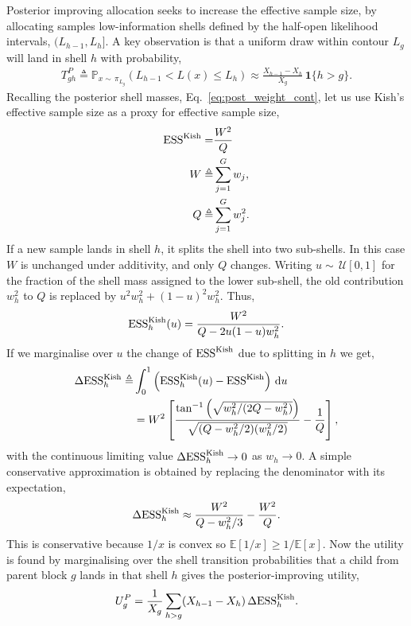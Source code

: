 \documentclass[pdflatex,sn-basic,icol]{sn-jnl}
\newcommand{\dd}{\mathrm{d}}
\newcommand{\E}{\mathbb{E}}
\newcommand{\Prob}{\mathbb{P}}
\theoremstyle{plain}
\theoremstyle{definition}
\begin{document}
\begin{appendices}
Posterior improving allocation seeks to increase the effective sample size, by allocating samples low-information shells defined by the half-open likelihood intervals, $(L_{h-1}, L_h]$.
A key observation is that a uniform draw within contour $L_g$ will land in shell $h$ with probability,
\begin{align}
    T^P_{g h}
    \triangleq
    \Prob_{x\sim\,\pi_{L_{g}}}(L_{h-1} < L(x) \le L_h)
    \approx \frac{ X_{h-1} -  X_{h}}{ X_g} \,\mathbf{1}\{h>g\}.
\end{align}
Recalling the posterior shell masses, Eq.~\ref{eq:post_weight_cont}, let us use Kish's effective sample size as a proxy for effective sample size,
\begin{align}
    \mathrm{ESS}^{\rm Kish} =& \frac{W^2}{Q}\\
    W\triangleq& \sum_{j=1}^{G} w_j,\\
    Q\triangleq& \sum_{j=1}^{G} w_j^2.
\end{align}
If a new sample lands in shell $h$, it splits the shell into two sub-shells.
In this case $W$ is unchanged under additivity, and only $Q$ changes.
Writing $u\sim\,\mathcal{U}[0, 1]$ for the fraction of the shell mass assigned to the lower sub-shell, the old contribution $w_h^2$ to $Q$ is replaced by $u^2 w_h^2+(1-u)^2 w_h^2$.
Thus,
\begin{align}
    \mathrm{ESS}^{\rm Kish}_{h}(u)
    =\frac{W^2}{Q - 2u(1-u)w_h^2}.
\end{align}
If we marginalise over $u$ the change of $\mathrm{ESS}^{\rm Kish}$ due to splitting in $h$ we get,
\begin{align}
    \Delta\mathrm{ESS}^{\rm Kish}_h
    \triangleq&
    \int_0^1
    \left(\mathrm{ESS}^{\rm Kish}_h(u)-\mathrm{ESS}^{\rm Kish}\right)\,\dd u \\
    &=
    W^2\left[
    \frac{
    \tan^{-1}\left(\sqrt{w_h^2/(2Q-w_h^2)}\right)
    }
    {\sqrt{(Q-w_h^2/2)(w_h^2/2)}}
    -\frac{1}{Q}
    \right],
    \label{eq:posterior_shell_value}
\end{align}
with the continuous limiting value $\Delta\mathrm{ESS}^{\rm Kish}_h \to 0$ as $w_h \to 0$.
A simple conservative approximation is obtained by replacing the denominator with its expectation,
\begin{align}
    \Delta\mathrm{ESS}^{\rm Kish}_h
    \approx
    \frac{W^2}{Q - w_h^2/3} - \frac{W^2}{Q}.
\end{align}
This is conservative because $1/x$ is convex so $\E[1/x] \ge 1/\E[x]$.
Now the utility is found by marginalising over the shell transition probabilities that a child from parent block $g$ lands in that shell $h$ gives the posterior-improving utility,
\begin{align}
    U^P_g
    =
    \frac{1}{X_g}\sum_{h > g}
     (X_{h-1}- X_h)\,\Delta\mathrm{ESS}^{\rm Kish}_h .
    \label{eq:posterior_improving_utility}
\end{align}



\end{appendices}
\end{document}
